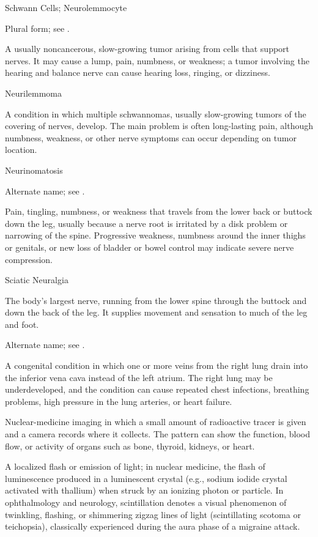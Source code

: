 \synonyms
Schwann Cells; Neurolemmocyte

 Plural form; see .

 A usually noncancerous, slow-growing tumor arising from cells that support nerves. It may cause a lump, pain, numbness, or weakness; a tumor involving the hearing and balance nerve can cause hearing loss, ringing, or dizziness.

\synonyms
Neurilemmoma

 A condition in which multiple schwannomas, usually slow-growing tumors of the covering of nerves, develop. The main problem is often long-lasting pain, although numbness, weakness, or other nerve symptoms can occur depending on tumor location.

\synonyms
Neurinomatosis

 Alternate name; see .

 Pain, tingling, numbness, or weakness that travels from the lower back or buttock down the leg, usually because a nerve root is irritated by a disk problem or narrowing of the spine. Progressive weakness, numbness around the inner thighs or genitals, or new loss of bladder or bowel control may indicate severe nerve compression.

\synonyms
Sciatic Neuralgia

 The body's largest nerve, running from the lower spine through the buttock and down the back of the leg. It supplies movement and sensation to much of the leg and foot.

 Alternate name; see .

 A congenital condition in which one or more veins from the right lung drain into the inferior vena cava instead of the left atrium. The right lung may be underdeveloped, and the condition can cause repeated chest infections, breathing problems, high pressure in the lung arteries, or heart failure.

 Nuclear-medicine imaging in which a small amount of radioactive tracer is given and a camera records where it collects. The pattern can show the function, blood flow, or activity of organs such as bone, thyroid, kidneys, or heart.

 A localized flash or emission of light; in nuclear medicine, the flash of luminescence produced in a luminescent crystal (e.g., sodium iodide crystal activated with thallium) when struck by an ionizing photon or particle. In ophthalmology and neurology, scintillation denotes a visual phenomenon of twinkling, flashing, or shimmering zigzag lines of light (scintillating scotoma or teichopsia), classically experienced during the aura phase of a migraine attack.

